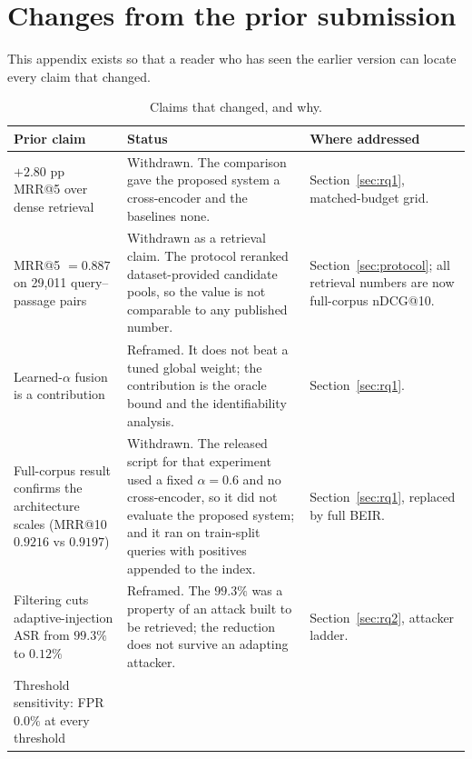 \documentclass{article}
\begin{document}



\appendix

\section{Changes from the prior submission}
\label{app:changes}

This appendix exists so that a reader who has seen the earlier version can
locate every claim that changed.

\begin{table}[h]
\centering
\small
\caption{Claims that changed, and why.}
\begin{tabular}{p{}p{}p{}}
\toprule
Prior claim & Status & Where addressed \\
\midrule
$+2.80$ pp MRR@5 over dense retrieval &
Withdrawn. The comparison gave the proposed system a cross-encoder and the
baselines none. &
Section~\ref{sec:rq1}, matched-budget grid. \\
\addlinespace
MRR@5 $= 0.887$ on 29,011 query--passage pairs &
Withdrawn as a retrieval claim. The protocol reranked dataset-provided candidate
pools, so the value is not comparable to any published number. &
Section~\ref{sec:protocol}; all retrieval numbers are now full-corpus nDCG@10. \\
\addlinespace
Learned-$\alpha$ fusion is a contribution &
Reframed. It does not beat a tuned global weight; the contribution is the
oracle bound and the identifiability analysis. &
Section~\ref{sec:rq1}. \\
\addlinespace
Full-corpus result confirms the architecture scales (MRR@10 $0.9216$ vs $0.9197$) &
Withdrawn. The released script for that experiment used a fixed $\alpha = 0.6$
and no cross-encoder, so it did not evaluate the proposed system; and it ran on
train-split queries with positives appended to the index. &
Section~\ref{sec:rq1}, replaced by full BEIR. \\
\addlinespace
Filtering cuts adaptive-injection ASR from $99.3\%$ to $0.12\%$ &
Reframed. The $99.3\%$ was a property of an attack built to be retrieved; the
reduction does not survive an adapting attacker. &
Section~\ref{sec:rq2}, attacker ladder. \\
\addlinespace
Threshold sensitivity: FPR $0.0\%$ at every threshold &

\end{tabular}
\end{table}
\end{document}
